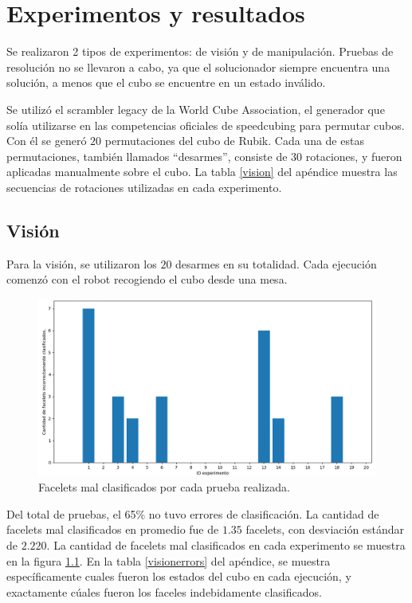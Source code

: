 \chapter{Experimentos y resultados}

Se realizaron 2 tipos de experimentos: de visión y de manipulación. Pruebas de resolución no se llevaron a cabo, ya que el solucionador siempre encuentra una solución, a menos que el cubo se encuentre en un estado inválido.

Se utilizó el scrambler legacy de la World Cube Association, el generador que solía utilizarse en las competencias oficiales de speedcubing para permutar  cubos. Con él se generó $20$ permutaciones del cubo de Rubik. Cada una de estas permutaciones, también llamados ``desarmes'', consiste de $30$ rotaciones, y fueron aplicadas manualmente sobre el cubo. La tabla \ref{vision} del apéndice muestra las secuencias de rotaciones utilizadas en cada experimento.

\section{Visión}
Para la visión, se utilizaron los $20$ desarmes en su totalidad. Cada ejecución comenzó con el robot recogiendo el cubo desde una mesa.

\begin{figure}[h!]
	\centering
	\includegraphics[width=\textwidth]{figures/error_facelet}
	\caption{Facelets mal clasificados por cada prueba realizada.}
	\label{erroresfacelets}
\end{figure}
Del total de pruebas, el 65\% no tuvo errores de clasificación. La cantidad de facelets mal clasificados en promedio fue de $1.35$ facelets, con desviación estándar de $2.220$. La cantidad de facelets mal clasificados en cada experimento se muestra en la figura \ref{erroresfacelets}. En la tabla \ref{visionerrors} del apéndice, se muestra específicamente cuales fueron los estados del cubo en cada ejecución, y exactamente cúales fueron los faceles indebidamente clasificados.

